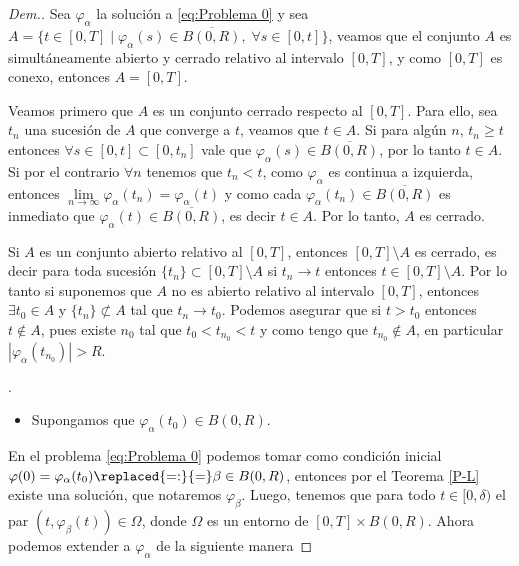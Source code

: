  \begin{proof}[Dem.] Sea $\varphi_\alpha$  la solución a \ref{eq:Problema 0} y sea $A=\{t\in [0,T] \mid \varphi_\alpha(s)\in \overline{B(0,R)}, \; \forall s\in [0,t]\}$, veamos que el conjunto $A$ es simultáneamente abierto y cerrado relativo al intervalo $[0,T]$, y  como $[0,T]$ es conexo, entonces $A=[0,T]$.

  \newpage
  
 Veamos primero que  $A$  es un conjunto cerrado respecto al $[0,T]$. Para ello, sea   $t_n$  una sucesión de $A$ que converge a $t$, veamos que $t\in A$.  Si para algún $n$, $t_n\geq t$ entonces $\forall s \in [0,t]\subset [0,t_n] $ vale que $\varphi_\alpha(s)\in\overline{B(0,R)}$,   por lo tanto  $t\in A$.  Si por el contrario $\forall n$ tenemos que $t_n < t$,  como $\varphi_\alpha$ es continua a izquierda, entonces $\lim\limits_{n\to \infty}\varphi_\alpha(t_n)=\varphi_\alpha(t)$ y como cada $\varphi_\alpha(t_n)\in \overline{B(0,R)}$ es inmediato que $\varphi_\alpha(t)\in \overline{B(0,R)}$, {\color{green} es decir $t\in A$}.  Por lo tanto, $A$ es cerrado.
 	 
  	Si $A$ es un conjunto abierto relativo al $[0,T]$, entonces $[0,T]\setminus A$ es cerrado, es decir para toda sucesión $\{t_n\}\subset [0,T]\setminus A$ si $t_n\to t$ entonces $t\in[0,T]\setminus A$. Por lo tanto si suponemos que  $A$ no es abierto relativo al intervalo $[0,T]$, entonces $\exists t_0\in A$ y $\{t_n\}\nsubset A$ tal que $t_n\to t_0$. Podemos asegurar que si $t> t_0$ entonces $t\notin A$, pues existe $n_0$ tal que $t_0<t_{n_0}<t$ y como tengo que $t_{n_0}\notin A$, en particular $|\varphi_\alpha(t_{n_0})|>R$. 
  	
   .%
 		\begin{itemize}
   		\item Supongamos que $\varphi_\alpha(t_0)\in B(0,R)$.
     \end{itemize}
En el problema \eqref{eq:Problema 0} podemos tomar como condición inicial $\varphi(0)=\varphi_\alpha(t_0)\replaced{=:}{=}\beta\in B(0,R)$, entonces por el Teorema \ref{P-L} existe una solución, que  notaremos  $\varphi_{\beta}$. Luego, tenemos que para todo $t\in [0,\delta)$ \normalmarginpar{} el par $(t,\varphi_\beta(t))\in \Omega$, donde  $\Omega$ es un entorno  de $[0,T]\times B(0,R)$. Ahora podemos extender a $\varphi_\alpha $ de la siguiente manera


\end{proof}
